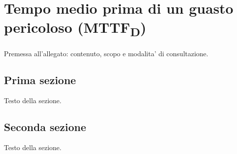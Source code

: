 \chapter{Tempo medio prima di un guasto pericoloso (\texorpdfstring{MTTF\textsubscript{D}}{MTTFD})}
\label{app:D}

Premessa all'allegato: contenuto, scopo e modalita' di consultazione.

\section{Prima sezione}
\label{sec:appD-1}

Testo della sezione.

\section{Seconda sezione}
\label{sec:appD-2}

Testo della sezione.
